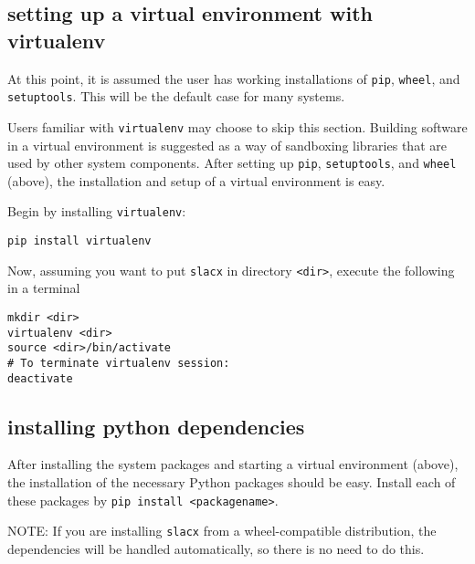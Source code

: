 \subsection{setting up a virtual environment with virtualenv}
\label{subsec:virtualenv}

At this point, it is assumed the user has working installations of
\verb|pip|, \verb|wheel|, and \verb|setuptools|.
This will be the default case for many systems.

Users familiar with \verb|virtualenv| may choose to skip this section.
Building software in a virtual environment is suggested 
as a way of sandboxing libraries that are used by other system components.
After setting up \verb|pip|, \verb|setuptools|, and \verb|wheel| (above),
the installation and setup of a virtual environment is easy.

Begin by installing \verb|virtualenv|:
\begin{lstlisting}
pip install virtualenv
\end{lstlisting}

Now, assuming you want to put \verb|slacx| in directory \verb|<dir>|, 
execute the following in a terminal

\begin{lstlisting}
mkdir <dir> 
virtualenv <dir>
source <dir>/bin/activate
# To terminate virtualenv session:
deactivate
\end{lstlisting}




\subsection{installing python dependencies}

After installing the system packages and starting a virtual environment (above),
the installation of the necessary Python packages should be easy.
Install each of these packages by \verb|pip install <packagename>|.

NOTE: If you are installing \verb|slacx| 
from a wheel-compatible distribution, 
the dependencies will be handled automatically,
so there is no need to do this.


